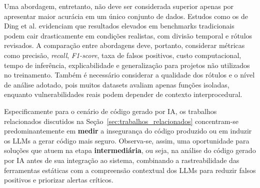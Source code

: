 Uma abordagem, entretanto, não deve ser considerada superior apenas por
apresentar maior acurácia em um único conjunto de dados. Estudos como
os de Ding et al. \cite{ding2024primevul} evidenciam que resultados
elevados em benchmarks tradicionais podem cair drasticamente em
condições realistas, com divisão temporal e rótulos revisados. A
comparação entre abordagens deve, portanto, considerar métricas como
precisão, \textit{recall}, \textit{F1-score}, taxa de falsos positivos,
custo computacional, tempo de inferência, explicabilidade e
generalização para projetos não utilizados no treinamento. Também é
necessário considerar a qualidade dos rótulos e o nível de análise
adotado, pois muitos datasets avaliam apenas funções isoladas, enquanto
vulnerabilidades reais podem depender de contexto interprocedural.

Especificamente para o cenário de código gerado por IA, os trabalhos
relacionados discutidos na Seção~\ref{sec:trabalhos_relacionados}
concentram-se predominantemente em \textbf{medir} a insegurança do
código produzido ou em induzir os LLMs a gerar código mais seguro.
Observa-se, assim, uma oportunidade para soluções que atuem na etapa
\textbf{intermediária}, ou seja, na análise do código gerado por IA
antes de sua integração ao sistema, combinando a rastreabilidade das
ferramentas estáticas com a compreensão contextual dos LLMs para reduzir
falsos positivos e priorizar alertas críticos.